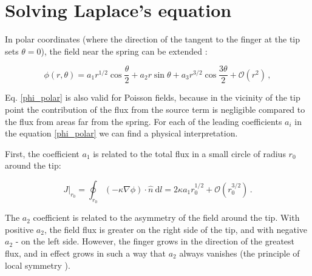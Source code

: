 \documentclass[]{pracamgr}
\begin{document}
  \section{Solving Laplace's equation}\label{chapter:solving}
    
    In polar coordinates (where the direction of the tangent to the finger at the tip sets $\theta = 0$), the field near the spring can be extended \cite{derrida1992needle , petroff2013bifurcation}:
    
    \begin{equation}\label{phi_polar}
      \phi(r,\theta)=a_1r^{1/2}\cos\frac{\theta}{2}+a_2r \sin \theta+a_3 r^{3/2} \cos\frac{3\theta}{2}+\mathcal{O}\left(r^2\right) \,,
    \end{equation}

    Eq. \eqref{phi_polar} is also valid for Poisson fields, because in the vicinity of the tip point the contribution of the flux from the source term is negligible compared to the flux from areas far from the spring. For each of the leading coefficients $a_i$ in the equation \eqref{phi_polar} we can find a physical interpretation.

    First, the coefficient $a_1$ is related to the total flux in a small circle of radius $r_0$ around the tip: 
    
    \begin{equation}\label{circle}
      J|_{r_0} = \oint_{r_0} (-\kappa \nabla \phi) \cdot \hat{n} \ \textrm{d}l = 2 \kappa a_1 r_0^{1/2} + \mathcal{O}\left(r_0^{3/2}\right) \,.
    \end{equation}

    The $a_2$ coefficient is related to the asymmetry of the field around the tip. With positive $a_2$, the field flux is greater on the right side of the tip, and with negative $a_2$ - on the left side. However, the finger grows in the direction of the greatest flux, and in effect grows in such a way that $a_2$ always vanishes (the principle of local symmetry \cite{cohen2015path}).
    
\end{document}
